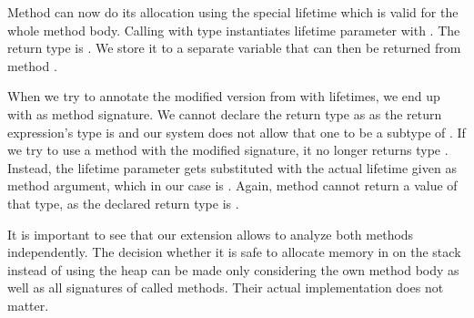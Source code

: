 Method  can now do its allocation using the special lifetime  which is valid for the whole method body.
Calling  with type  instantiates lifetime parameter  with .
The return type is .
We store it to a separate variable that can then be returned from method .

When we try to annotate the modified version from  with lifetimes, we end up with  as method signature.
We cannot declare the return type as  as the return expression's type is  and our system does not allow that one to be a subtype of .
If we try to use a method  with the modified signature, it no longer returns type .
Instead, the lifetime parameter  gets substituted with the actual lifetime given as method argument, which in our case is .
Again, method  cannot return a value of that type, as the declared return type is .

It is important to see that our extension allows to analyze both methods independently.
The decision whether it is safe to allocate memory in  on the stack instead of using the heap can be made only considering the own method body as well as all signatures of called methods.
Their actual implementation does not matter.
